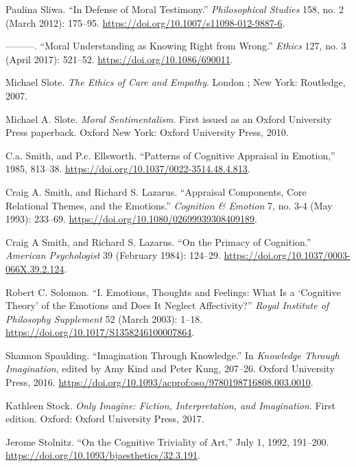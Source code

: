 \documentclass[phdthesis,12pt,final,a4paper]{wuthesis}
\newlength{\cslhangindent}
\newenvironment{CSLReferences}[2] %
{\begin{list}{}{%
	\setlength{\itemindent}{0pt}
	\setlength{\leftmargin}{0pt}
	\setlength{\parsep}{0pt}
	\ifodd #1
	\setlength{\leftmargin}{\cslhangindent}
	\setlength{\itemindent}{-1\cslhangindent}
	\fi
	\setlength{\itemsep}{#2\baselineskip}}}
{\end{list}}
\theoremstyle{definition}
\theoremstyle{definition}
\theoremstyle{definition}
\theoremstyle{definition}
\theoremstyle{remark}
\begin{document}
\begin{CSLReferences}{1}{0}
Paulina Sliwa. {``In Defense of Moral Testimony.''} \emph{Philosophical Studies} 158, no. 2 (March 2012): 175--95. \url{https://doi.org/10.1007/s11098-012-9887-6}.

---------. {``Moral {Understanding} as {Knowing Right} from {Wrong}.''} \emph{Ethics} 127, no. 3 (April 2017): 521--52. \url{https://doi.org/10.1086/690011}.

Michael Slote. \emph{The {Ethics} of {Care} and {Empathy}}. London ; New York: Routledge, 2007.

Michael A. Slote. \emph{Moral {Sentimentalism}}. First issued as an Oxford University Press paperback. Oxford New York: Oxford University Press, 2010.

C.a. Smith, and P.c. Ellsworth. {``Patterns of {Cognitive Appraisal} in {Emotion},''} 1985, 813--38. \url{https://doi.org/10.1037/0022-3514.48.4.813}.

Craig A. Smith, and Richard S. Lazarus. {``Appraisal {Components}, {Core Relational Themes}, and the {Emotions}.''} \emph{Cognition \& Emotion} 7, no. 3-4 (May 1993): 233--69. \url{https://doi.org/10.1080/02699939308409189}.

Craig A Smith, and Richard S. Lazarus. {``On the {Primacy} of {Cognition}.''} \emph{American Psychologist} 39 (February 1984): 124--29. \url{https://doi.org/10.1037/0003-066X.39.2.124}.

Robert C. Solomon. {``I. {Emotions}, {Thoughts} and {Feelings}: {What} Is a {`{Cognitive Theory}'} of the {Emotions} and {Does} It {Neglect Affectivity}?''} \emph{Royal Institute of Philosophy Supplement} 52 (March 2003): 1--18. \url{https://doi.org/10.1017/S1358246100007864}.

Shannon Spaulding. {``Imagination {Through Knowledge}.''} In \emph{Knowledge {Through Imagination}}, edited by Amy Kind and Peter Kung, 207--26. Oxford University Press, 2016. \url{https://doi.org/10.1093/acprof:oso/9780198716808.003.0010}.

Kathleen Stock. \emph{Only Imagine: Fiction, Interpretation, and Imagination}. First edition. Oxford: Oxford University Press, 2017.

Jerome Stolnitz. {``On the {Cognitive Triviality} of {Art},''} July 1, 1992, 191--200. \url{https://doi.org/10.1093/bjaesthetics/32.3.191}.


\end{CSLReferences}
\end{document}
